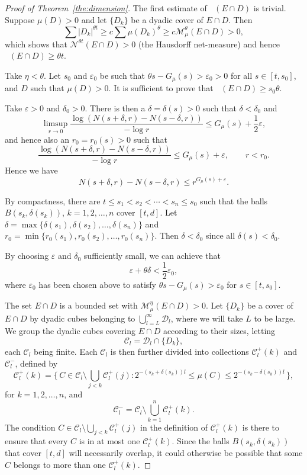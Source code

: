 \documentclass[11pt]{article}
\theoremstyle{definition}
\numberwithin{equation}{section}
\numberwithin{figure}{section}
\numberwithin{table}{section}
\DeclareMathOperator{\dimh}{dim_H}
\begin{document}
\begin{proof}[Proof of Theorem~\ref{the:dimension}]
The first estimate of $\dimh (E \cap D)$ is trivial. Suppose $\mu (D) > 0$ and let $\{D_k\}$ be a dyadic cover of $E \cap D$. Then
\[
\sum |D_k|^{\theta t} \geq c \sum \mu (D_k)^\theta \geq c
\mathscr{M}_{\mu}^\theta (E \cap D) > 0,
\]
which shows that $\mathscr{N}^{\theta t} (E \cap D) > 0$ (the Hausdorff net-measure) and hence \linebreak$\dimh (E \cap D) \geq \theta t$.

Take $\eta < \theta$. Let $s_0$ and $\varepsilon_0$ be such that $\theta s - G_\mu (s) > \varepsilon_0 > 0$ for all $s \in [t,s_0]$, and $D$ such that $\mu (D) > 0$. It is sufficient to prove that $\dimh (E \cap D) \geq s_0 \theta$.

Take $\varepsilon > 0$ and $\delta_0 > 0$. There is then a $\delta =
\delta (s) > 0$ such that $\delta < \delta_0$ and
\[
\limsup_{r \to 0} \frac{\log (N(s+\delta, r) - N(s-\delta, r))}{-
\log r} \leq G_\mu (s) + \frac{1}{2} \varepsilon,
\]
and hence also an $r_0 = r_0 (s) > 0$ such that
\[
\frac{\log (N(s+\delta, r) - N(s-\delta, r))}{-
\log r} \leq G_\mu (s) + \varepsilon, \qquad r < r_0.
\]
Hence we have
\begin{equation}\label{eq:numberofcubes}
N(s+\delta, r) - N(s-\delta, r) \leq r^{G_\mu (s) + \varepsilon}.
\end{equation}

By compactness, there are $t \leq s_1 < s_2 < \cdots < s_n \leq s_0$ such that the balls $B(s_k, \delta(s_k))$, $k = 1, 2, \ldots, n$ cover $[t,d]$. Let $\delta = \max \{\delta (s_1), \delta(s_2),
\ldots, \delta(s_n)\}$ and $r_0 = \min \{r_0 (s_1), r_0(s_2),
\ldots, r_0(s_n)\}$. Then $\delta < \delta_0$ since all $\delta (s) < \delta_0$.

By choosing $\varepsilon$ and $\delta_0$ sufficiently small, we can achieve that
\[
\varepsilon + \theta \delta < \frac{1}{2} \varepsilon_0,
\]
where $\varepsilon_0$ has been chosen above to satisfy $\theta s - G_\mu (s) > \varepsilon_0$ for $s \in [t,s_0]$.

The set $E \cap D$ is a bounded set with $\mathscr{M}_\mu^\eta (E
\cap D) > 0$. Let $\{D_k\}$ be a cover of $E \cap D$ by dyadic cubes belonging to $\bigcup_{l = L}^\infty \mathscr{D}_l$, where we will take $L$ to be large. We group the dyadic cubes covering $E \cap D$ according to their sizes, letting
\[
\mathscr{C}_l = \mathscr{D}_l \cap \{D_k\},
\]
each $\mathscr{C}_l$ being finite. Each $\mathscr{C}_l$ is then further divided into collections $\mathscr{C}_l^+ (k)$ and $\mathscr{C}_l^-$, defined by
\[
\mathscr{C}_l^+ (k) = \biggl\{\, C \in \mathscr{C}_l \setminus
\bigcup_{j < k} \mathscr{C}_l^+ (j) : 2^{-(s_k+\delta (s_k))l} \leq
\mu (C) \leq 2^{-(s_k-\delta (s_k))l} \,\biggr\},
\]
for $k = 1,2,\ldots,n$, and
\[
\mathscr{C}_l^- = \mathscr{C}_l \setminus \bigcup_{k=1}^n
\mathscr{C}_l^+ (k).
\]
The condition $C \in \mathscr{C}_l \setminus \bigcup_{j < k}
\mathscr{C}_l^+ (j)$ in the definition of $\mathscr{C}_l^+ (k)$ is there to ensure that every $C$ is in at most one $\mathscr{C}_l^+ (k)$. Since the balls $B (s_k, \delta(s_k))$ that cover $[t,d]$ will necessarily overlap, it could otherwise be possible that some $C$ belongs to more than one $\mathscr{C}_l^+ (k)$.


\end{proof}
\end{document}
